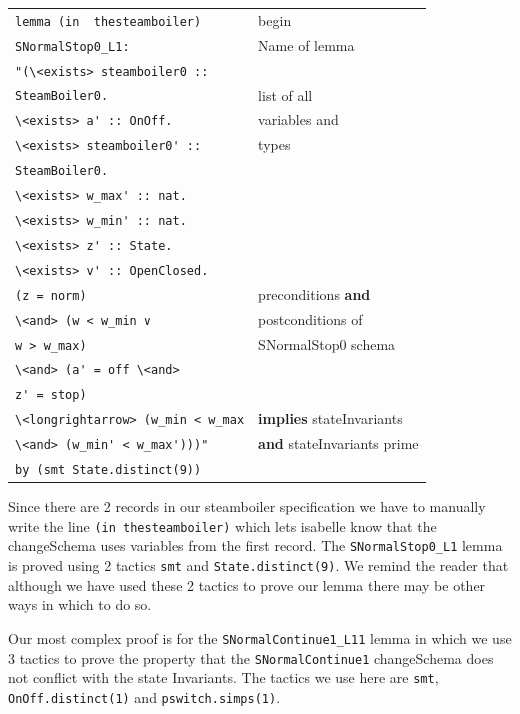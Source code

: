\noindent \begin{tabular}{|l | l|}
\hline
\verb|lemma (in  thesteamboiler)| & {\color{red}begin} \\
\verb|SNormalStop0_L1:|& {\color{red}Name of lemma} \\
\verb|"(\<exists> steamboiler0 :: | & \\
\verb|SteamBoiler0.|&  {\color{red}list of all} \\
\verb|\<exists> a' :: OnOff.|&  {\color{red}variables and} \\
\verb|\<exists> steamboiler0' :: | & {\color{red}types} \\
\verb|SteamBoiler0.|&  \\
\verb|\<exists> w_max' :: nat.|&  \\
\verb|\<exists> w_min' :: nat.|&  \\
\verb|\<exists> z' :: State.|&  \\
\verb|\<exists> v' :: OpenClosed.|&  \\
\verb|(z = norm)|&  {\color{red}preconditions \textbf{and}}\\
\verb|\<and> (w < w_min ∨|& {\color{red}postconditions of} \\
\verb|w > w_max)|& {\color{red}SNormalStop0 schema} \\
\verb|\<and> (a' = off \<and>|&  \\
\verb|z' = stop)|&  \\
\verb|\<longrightarrow> (w_min < w_max|& {\color{red}\textbf{implies}
stateInvariants} \\
\verb|\<and> (w_min' < w_max')))"|& {\color{red}\textbf{and} stateInvariants
prime} \\
\verb|by (smt State.distinct(9))|&  \\
\hline
\end{tabular}

Since there are 2 records in our steamboiler specification we have to manually
write the line \verb|(in thesteamboiler)| which lets isabelle know that the
changeSchema uses variables from the first record. The \verb|SNormalStop0_L1|
lemma is proved using 2 tactics \verb|smt| and \verb|State.distinct(9)|. We
remind the reader that although we have used these 2 tactics to prove our lemma
there may be other ways in which to do so. 

Our most complex proof is for the \verb|SNormalContinue1_L11| lemma in which we
use 3 tactics to prove the property that the \verb|SNormalContinue1|
changeSchema does not conflict with the state Invariants. The tactics we use
here are \verb|smt|, \verb|OnOff.distinct(1)| and \verb|pswitch.simps(1)|.

